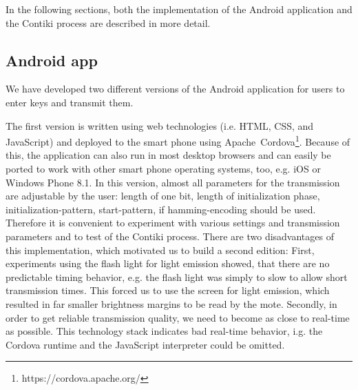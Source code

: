 \documentclass{sig-alternate} %
\begin{document}
In the following sections, both the implementation of the Android application and the Contiki process are described in more detail.

\subsection{Android app}
\label{sub:android_app}

We have developed two different versions of the Android application for users to enter keys and transmit them.


The first version is written using web technologies (i.e. HTML, CSS, and JavaScript) and deployed to the smart phone using Apache~Cordova\footnote{https://cordova.apache.org/}.
Because of this, the application can also run in most desktop browsers and can easily be ported to work with other smart phone operating systems, too, e.g. iOS or Windows Phone 8.1.
In this version, almost all parameters for the transmission are adjustable by the user: length of one bit, length of initialization phase, initialization-pattern, start-pattern, if hamming-encoding should be used.
Therefore it is convenient to experiment with various settings and transmission parameters and to test of the Contiki process.
There are two disadvantages of this implementation, which motivated us to build a second edition:
First, experiments using the flash light for light emission showed, that there are no predictable timing behavior, e.g. the flash light was simply to slow to allow short transmission times.
This forced us to use the screen for light emission, which resulted in far smaller brightness margins to be read by the mote.
Secondly, in order to get reliable transmission quality, we need to become as close to real-time as possible.
This technology stack indicates bad real-time behavior, i.g. the Cordova runtime and the JavaScript interpreter could be omitted.



\end{document}
